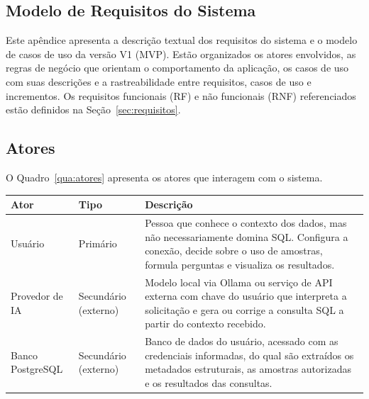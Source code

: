 
\begin{apendicesenv}
	
	\partapendices
	
	\chapter{Modelo de Requisitos do Sistema}
	
\label{ap:requisitos}

Este apêndice apresenta a descrição textual dos requisitos do sistema e o modelo de casos de uso da versão V1 (MVP). Estão organizados os atores envolvidos, as regras de negócio que orientam o comportamento da aplicação, os casos de uso com suas descrições e a rastreabilidade entre requisitos, casos de uso e incrementos. Os requisitos funcionais (RF) e não funcionais (RNF) referenciados estão definidos na Seção~\ref{sec:requisitos}.

\section{Atores}
\label{ap:atores}

O Quadro~\ref{qua:atores} apresenta os atores que interagem com o sistema.

\begin{quadro}[htb]
    \caption{Atores do sistema}
    \label{qua:atores}
    \begin{tabular}{|p{3.2cm}|p{2.6cm}|p{8.4cm}|}
        \hline
        \textbf{Ator} & \textbf{Tipo} & \textbf{Descrição} \\ \hline
        Usuário & Primário & Pessoa que conhece o contexto dos dados, mas não necessariamente domina SQL. Configura a conexão, decide sobre o uso de amostras, formula perguntas e visualiza os resultados. \\ \hline
        Provedor de IA & Secundário (externo) & Modelo local via Ollama ou serviço de API externa com chave do usuário que interpreta a solicitação e gera ou corrige a consulta SQL a partir do contexto recebido. \\ \hline
        Banco PostgreSQL & Secundário (externo) & Banco de dados do usuário, acessado com as credenciais informadas, do qual são extraídos os metadados estruturais, as amostras autorizadas e os resultados das consultas. \\ \hline
    \end{tabular}
\end{quadro}


\end{apendicesenv}
